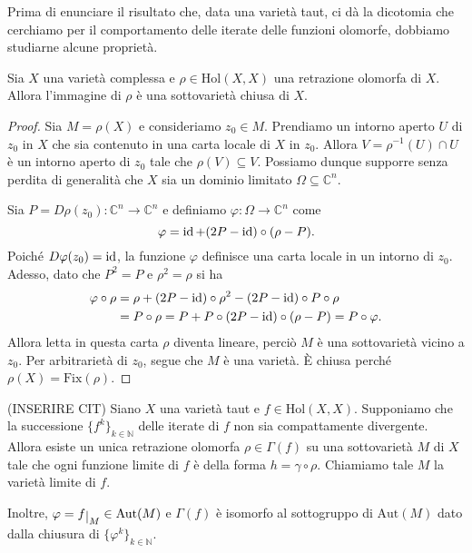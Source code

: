 Prima di enunciare il risultato che, data una varietà taut, ci dà la dicotomia che cerchiamo per il comportamento delle iterate delle funzioni olomorfe, dobbiamo studiarne alcune proprietà.

\begin{lm}
    Sia $X$ una varietà complessa e $\rho\in\text{Hol}(X,X)$ una retrazione olomorfa di $X$. Allora l'immagine di $\rho$ è una sottovarietà chiusa di $X$.
\end{lm}
\begin{proof}
    Sia $M=\rho(X)$ e consideriamo $z_0 \in M$. Prendiamo un intorno aperto $U$ di $z_0$ in $X$ che sia contenuto in una carta locale di $X$ in $z_0$. Allora $V=\rho^{-1}(U)\cap U$ è un intorno aperto di $z_0$ tale che $\rho(V) \subseteq V$. Possiamo dunque supporre senza perdita di generalità che $X$ sia un dominio limitato $\Omega\subseteq\mathbb{C}^n$.

    Sia $P=D\rho(z_0):\mathbb{C}^n \longrightarrow \mathbb{C}^n$ e definiamo $\varphi:\Omega \longrightarrow \mathbb{C}^n$ come
    $$\varphi=\operatorname{id}+(2P-\operatorname{id})\circ(\rho-P).$$
    Poiché $D\varphi(z_0)=\operatorname{id}$, la funzione $\varphi$ definisce una carta locale in un intorno di $z_0$. Adesso, dato che $P^2=P$ e $\rho^2=\rho$ si ha
    \begin{align*}
        \varphi\circ\rho&=\rho+(2P-\operatorname{id})\circ\rho^2-(2P-\operatorname{id})\circ P\circ\rho\\
        &=P\circ\rho=P+P\circ(2P-\operatorname{id})\circ(\rho-P)=P\circ\varphi.
    \end{align*}
    Allora letta in questa carta $\rho$ diventa lineare, perciò $M$ è una sottovarietà vicino a $z_0$. Per arbitrarietà di $z_0$, segue che $M$ è una varietà. È chiusa perché $\rho(X)=\text{Fix}(\rho)$.
\end{proof}

\begin{thm} \label{retraiii}
    (INSERIRE CIT) Siano $X$ una varietà taut e $f\in\text{Hol}(X,X)$. Supponiamo che la successione $\{f^k\}_{k\in\mathbb{N}}$ delle iterate di $f$ non sia compattamente divergente. Allora esiste un unica retrazione olomorfa $\rho\in\Gamma(f)$ su una sottovarietà $M$ di $X$ tale che ogni funzione limite di $f$ è della forma $h=\gamma\circ\rho$. Chiamiamo tale $M$ la \textnormal{varietà limite} di $f$.

    Inoltre, $\varphi=f\restrict{M}\in\text{Aut}(M)$ e $\Gamma(f)$ è isomorfo al sottogruppo di $\text{Aut}(M)$ dato dalla chiusura di $\{\varphi^k\}_{k \in\mathbb{N}}$.
\end{thm}

